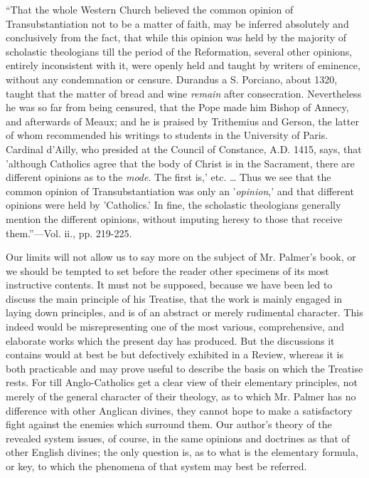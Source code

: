 ``That
the whole Western Church believed the common opinion of
Transubstantiation not to be a matter of faith, may be inferred
absolutely and conclusively from the fact, that while this opinion was
held by the majority of scholastic theologians till the period of the
Reformation, several other opinions, entirely inconsistent with it,
were openly held and taught by writers of eminence, without any
condemnation or censure. Durandus a S. Porciano, about 1320, taught
that the matter of bread and wine \emph{remain} after consecration.
Nevertheless he was so far from being censured, that the Pope made him
Bishop of Annecy, and afterwards of Meaux; and he is praised by
Trithemius and Gerson, the latter of whom recommended his writings to
students in the University of Paris. Cardinal d'Ailly, who presided at
the Council of Constance, A.D. 1415, says, that 'although Catholics
agree that the body of Christ is in the Sacrament, there are different
opinions as to the \emph{mode}. The first is,' etc. … Thus we see
that the common opinion of Transubstantiation was only an '\emph{opinion},'
and that different opinions were held by 'Catholics.' In fine, the
scholastic theologians generally mention the different opinions,
without imputing heresy to those that receive them.''—Vol. ii., pp.
219-225.

Our limits will not allow us to say more on the
subject of Mr. Palmer's book, or we should be tempted to set before
the reader other specimens of its most instructive contents. It must
not be supposed, because we have been led to discuss the main
principle of his Treatise, that the work is mainly engaged in laying
down principles, and is of an abstract or merely rudimental character.
This indeed would be misrepresenting one of the most various,
comprehensive, and elaborate works which the present day has
produced. But the discussions it contains would at best be but
defectively exhibited in a Review, whereas it is both practicable and
may prove useful to describe the basis on which the Treatise rests.
For till Anglo-Catholics get a clear view of their elementary
principles, not merely of the general character of their theology, as
to which Mr. Palmer has no difference with other Anglican divines,
they cannot hope to make a satisfactory fight against the enemies
which surround them. Our author's theory of the revealed system
issues, of course, in the same opinions and doctrines as that of other
English divines; the only question is, as to what is the elementary
formula, or key, to which the phenomena of that system may best be
referred.


